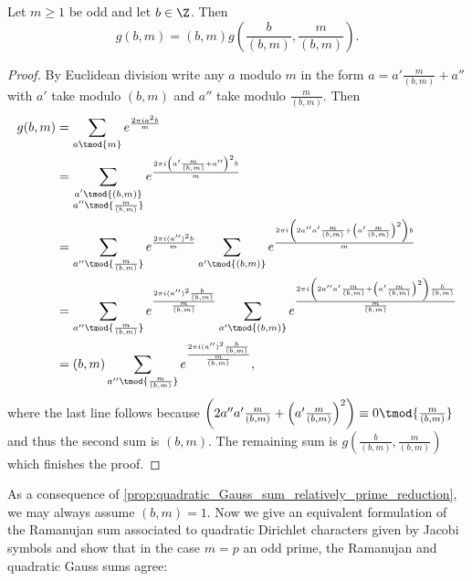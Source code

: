       \begin{proposition}\label{prop:quadratic_Gauss_sum_relatively_prime_reduction}
        Let $m \ge 1$ be odd and let $b \in \Z$. Then
        \[
          g(b,m) = (b,m)g\left(\frac{b}{(b,m)},\frac{m}{(b,m)}\right).
        \]
      \end{proposition}
      \begin{proof}
        By Euclidean division write any $a$ modulo $m$ in the form $a = a'\frac{m}{(b,m)}+a''$ with $a'$ take modulo $(b,m)$ and $a''$ take modulo $\frac{m}{(b,m)}$. Then
        \begin{align*}
          g(b,m) &= \sum_{a \tmod{m}}e^{\frac{2\pi ia^{2}b}{m}} \\
          &= \sum_{\substack{a' \tmod{(b,m)} \\ a'' \tmod{\frac{m}{(b,m)}}}}e^{\frac{2\pi i\left(a'\frac{m}{(b,m)}+a''\right)^{2}b}{m}} \\
          &= \sum_{a'' \tmod{\frac{m}{(b,m)}}}e^{\frac{2\pi i(a'')^{2}b}{m}}\sum_{a' \tmod{(b,m)}}e^{\frac{2\pi i\left(2a''a'\frac{m}{(b,m)}+\left(a'\frac{m}{(b,m)}\right)^{2}\right)b}{m}} \\
          &= \sum_{a'' \tmod{\frac{m}{(b,m)}}}e^{\frac{2\pi i(a'')^{2}\frac{b}{(b,m)}}{\frac{m}{(b,m)}}}\sum_{a' \tmod{(b,m)}}e^{\frac{2\pi i\left(2a''a'\frac{m}{(b,m)}+\left(a'\frac{m}{(b,m)}\right)^{2}\right)\frac{b}{(b,m)}}{\frac{m}{(b,m)}}} \\
          &= (b,m)\sum_{a'' \tmod{\frac{m}{(b,m)}}}e^{\frac{2\pi i(a'')^{2}\frac{b}{(b,m)}}{\frac{m}{(b,m)}}},
        \end{align*}
        where the last line follows because $\left(2a''a'\frac{m}{(b,m)}+\left(a'\frac{m}{(b,m)}\right)^{2}\right) \equiv 0 \tmod{\frac{m}{(b,m)}}$ and thus the second sum is $(b,m)$. The remaining sum is $g\left(\frac{b}{(b,m)},\frac{m}{(b,m)}\right)$ which finishes the proof.
      \end{proof}

      As a consequence of \cref{prop:quadratic_Gauss_sum_relatively_prime_reduction}, we may always assume $(b,m) = 1$. Now we give an equivalent formulation of the Ramanujan sum associated to quadratic Dirichlet characters given by Jacobi symbols and show that in the case $m = p$ an odd prime, the Ramanujan and quadratic Gauss sums agree:

